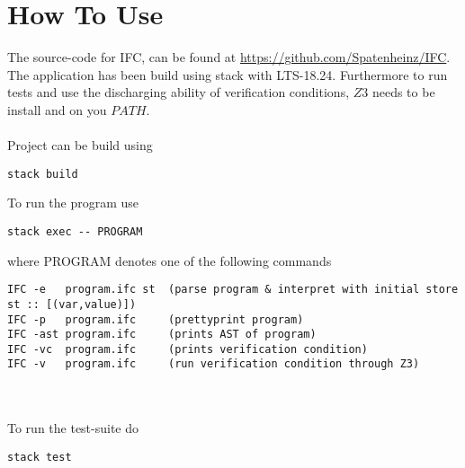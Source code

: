 \section{How To Use}\label{sec:guide}
The source-code for IFC, can be found at \url{https://github.com/Spatenheinz/IFC}. The application has been build using stack with LTS-18.24.
Furthermore to run tests and use the discharging ability of verification conditions, $Z3$ needs to be install and on you $PATH$.
\\~\\
Project can be build using
\begin{verbatim}
stack build
\end{verbatim}

To run the program use
\begin{verbatim}
stack exec -- PROGRAM
\end{verbatim}
where PROGRAM denotes one of the following commands
\begin{verbatim}
IFC -e   program.ifc st  (parse program & interpret with initial store st :: [(var,value)])
IFC -p   program.ifc     (prettyprint program)
IFC -ast program.ifc     (prints AST of program)
IFC -vc  program.ifc     (prints verification condition)
IFC -v   program.ifc     (run verification condition through Z3)
\end{verbatim}
\\~\\
To run the test-suite do
\begin{verbatim}
stack test
\end{verbatim}
